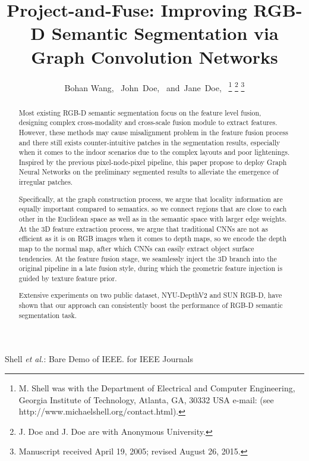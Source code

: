 ﻿\documentclass[journal]{IEEEtran}
\begin{document}


\title{Project-and-Fuse: Improving RGB-D Semantic Segmentation via Graph Convolution Networks}

\author{Bohan Wang,~
        John~Doe,~
        and~Jane~Doe,~%
\thanks{M. Shell was with the Department
of Electrical and Computer Engineering, Georgia Institute of Technology, Atlanta,
GA, 30332 USA e-mail: (see http://www.michaelshell.org/contact.html).}%
\thanks{J. Doe and J. Doe are with Anonymous University.}%
\thanks{Manuscript received April 19, 2005; revised August 26, 2015.}}

%
{Shell \MakeLowercase{\textit{et al.}}: Bare Demo of IEEE. for IEEE Journals}

\maketitle

\begin{abstract}
    Most existing RGB-D semantic segmentation focus on the feature level fusion, designing complex cross-modality and cross-scale fusion module to extract features. However, these methods may cause misalignment problem in the feature fusion process and there still exists counter-intuitive patches in the segmentation results, especially when it comes to the indoor scenarios due to the complex layouts and poor lightenings. Inspired by the previous pixel-node-pixel pipeline, this paper propose to deploy Graph Neural Networks on the preliminary segmented results to alleviate the emergence of irregular patches. 
    
    Specifically, at the graph construction process, we argue that locality information are equally important compared to semantics. so we connect regions that are close to each other in the Euclidean space as well as in the semantic space with larger edge weights. At the 3D feature extraction process, we argue that traditional CNNs are not as efficient as it is on RGB images when it comes to depth maps, so we encode the depth map to the normal map, after which CNNs can easily extract object surface tendencies. At the feature fusion stage, we seamlessly inject the 3D branch into the original pipeline in a late fusion style, during which the geometric feature injection is guided by texture feature prior. 

    Extensive experiments on two public dataset, NYU-DepthV2 and SUN RGB-D, have shown that our approach can consistently boost the performance of RGB-D semantic segmentation task.
    \end{abstract}
\end{document}
